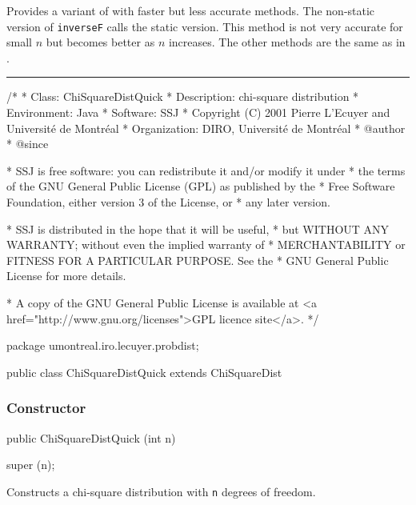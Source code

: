 
Provides a variant of  with
faster but less accurate methods.
The non-static version of 
\texttt{inverseF} calls the static version.
This method is not very accurate for small $n$ but becomes
better as $n$ increases.
The other methods are the same as in .

\bigskip\hrule

\begin{code}
\begin{hide}
/*
 * Class:        ChiSquareDistQuick
 * Description:  chi-square distribution
 * Environment:  Java
 * Software:     SSJ 
 * Copyright (C) 2001  Pierre L'Ecuyer and Université de Montréal
 * Organization: DIRO, Université de Montréal
 * @author       
 * @since

 * SSJ is free software: you can redistribute it and/or modify it under
 * the terms of the GNU General Public License (GPL) as published by the
 * Free Software Foundation, either version 3 of the License, or
 * any later version.

 * SSJ is distributed in the hope that it will be useful,
 * but WITHOUT ANY WARRANTY; without even the implied warranty of
 * MERCHANTABILITY or FITNESS FOR A PARTICULAR PURPOSE.  See the
 * GNU General Public License for more details.

 * A copy of the GNU General Public License is available at
   <a href="http://www.gnu.org/licenses">GPL licence site</a>.
 */
\end{hide}
package umontreal.iro.lecuyer.probdist;


public class ChiSquareDistQuick extends ChiSquareDist\begin{hide} {
\end{hide}
\end{code}
\subsubsection* {Constructor}

\begin{code}

   public ChiSquareDistQuick (int n)\begin{hide} {
      super (n);
   }\end{hide}
\end{code}
\begin{tabb}
   Constructs a chi-square distribution with \texttt{n} degrees of freedom.
\end{tabb}


